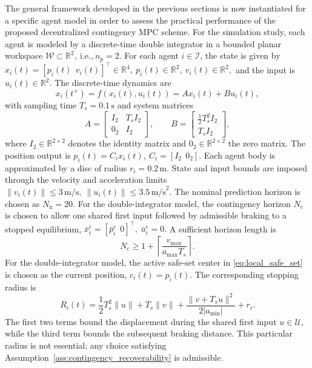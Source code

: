 \documentclass[twocolumn]{autart}
\begin{document}
The general framework developed in the previous sections is now instantiated for a specific agent model in order to assess the practical performance of the proposed decentralized contingency MPC scheme.
For the simulation study, each agent is modeled by a discrete-time double integrator in a bounded planar workspace
\(
\mathcal W \subset \mathbb R^2, \ \text{i.e.,} \ n_p = 2.
\)
For each agent $i\in\mathcal I$, the state is given by
\(
x_i(t)=
[
p_i(t)\ \
v_i(t)
]^\top
\in\mathbb R^4,
\ 
p_i(t)\in\mathbb R^2,
\
v_i(t)\in\mathbb R^2,
\)
and the input is
\(
u_i(t)\in\mathbb R^2.
\)
The discrete-time dynamics are
\begin{equation}
x_i(t^+)=f(x_i(t),u_i(t)) = Ax_i(t)+Bu_i(t),
\label{eq:sim_double_integrator}
\end{equation}
with sampling time $T_s=0.1\,\mathrm{s}$ and system matrices
\[
A=
\begin{bmatrix}
I_2 & T_s I_2\\
0_2 & I_2
\end{bmatrix},
\qquad
B=
\begin{bmatrix}
\frac{1}{2}T_s^2 I_2\\
T_s I_2
\end{bmatrix},
\]
where $I_2\in\mathbb R^{2\times 2}$ denotes the identity matrix and $0_2\in\mathbb R^{2\times 2}$ the zero matrix.
The position output is
\(
p_i(t)=C_i x_i(t),
\
C_i=[ I_2 \ \  0_2 ].
\)
Each agent body is approximated by a disc of radius
\(
r_i=0.2\,\mathrm{m}.
\)
State and input bounds are imposed through the velocity and acceleration limits
\(
\|v_i(t)\|\le 3\,\mathrm{m/s},
\
\|u_i(t)\|\le 3.5\,\mathrm{m/s}^2.
\)
The nominal prediction horizon is chosen as \(N_{\mathrm n}=20\). For the
double-integrator model, the contingency horizon \(N_{\mathrm c}\) is
chosen to allow one shared first input followed by admissible braking to
a stopped equilibrium,
\(
\bar x_i^{\mathrm c} =
[
\bar p_i^{\mathrm c} \ \ 
0
]^\top,
\ 
\bar u_i^{\mathrm c}=0.
\)
A sufficient horizon length is
\begin{equation}
N_{\mathrm c}
\ge
1+\left\lceil\frac{v_{\max}}{a_{\max}T_s}\right\rceil .
\label{eq:sim_Nc_choice}
\end{equation}
For the double-integrator model, the active safe-set center in
\eqref{eq:local_safe_set} is chosen as the current position,
\(c_i(t)=p_i(t)\). The corresponding stopping radius is
\[
R_i(t)
=
\frac{1}{2}T_s^2\|u\|
+
T_s\|v\|
+
\frac{\|v+T_su\|^2}{2|a_{\mathrm{min}}|}
+
r_i .
\]
The first two terms bound the displacement during the shared first input
\(u\in\mathcal U\), while the third term bounds the subsequent braking
distance. This particular radius is not essential; any choice satisfying
Assumption~\ref{ass:contingency_recoverability} is admissible.
\end{document}
